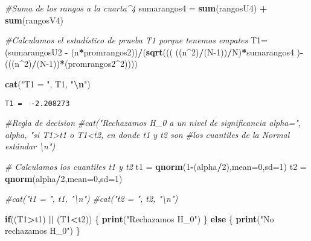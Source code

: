 \documentclass[
  a4paper,
  oneside,
  openany]{book}
\newenvironment{Shaded}{\begin{snugshade}}{\end{snugshade}}
\newcommand{\AttributeTok}[1]{\textcolor[rgb]{0.13,0.29,0.53}{#1}}
\newcommand{\CommentTok}[1]{\textcolor[rgb]{0.56,0.35,0.01}{\textit{#1}}}
\newcommand{\ControlFlowTok}[1]{\textcolor[rgb]{0.13,0.29,0.53}{\textbf{#1}}}
\newcommand{\DecValTok}[1]{\textcolor[rgb]{0.00,0.00,0.81}{#1}}
\newcommand{\FunctionTok}[1]{\textcolor[rgb]{0.13,0.29,0.53}{\textbf{#1}}}
\newcommand{\NormalTok}[1]{#1}
\newcommand{\OtherTok}[1]{\textcolor[rgb]{0.56,0.35,0.01}{#1}}
\newcommand{\SpecialCharTok}[1]{\textcolor[rgb]{0.81,0.36,0.00}{\textbf{#1}}}
\newcommand{\StringTok}[1]{\textcolor[rgb]{0.31,0.60,0.02}{#1}}
\begin{document}
\begin{Shaded}
\begin{Highlighting}[]
\CommentTok{\#Suma de los rangos a la cuarta\^{}4}
\NormalTok{sumarangos4 }\OtherTok{=} \FunctionTok{sum}\NormalTok{(rangosU4) }\SpecialCharTok{+} \FunctionTok{sum}\NormalTok{(rangosV4)}

\CommentTok{\#Calculamos el estadístico de prueba T1 porque tenemos empates}
\NormalTok{T1}\OtherTok{=}\NormalTok{(sumarangosU2 }\SpecialCharTok{{-}}\NormalTok{ (n}\SpecialCharTok{*}\NormalTok{promrangos2))}\SpecialCharTok{/}\NormalTok{(}\FunctionTok{sqrt}\NormalTok{(((      ((n}\SpecialCharTok{\^{}}\DecValTok{2}\NormalTok{)}\SpecialCharTok{/}\NormalTok{(N}\DecValTok{{-}1}\NormalTok{))}\SpecialCharTok{/}\NormalTok{N)}\SpecialCharTok{*}\NormalTok{sumarangos4 )}\SpecialCharTok{{-}}\NormalTok{(((n}\SpecialCharTok{\^{}}\DecValTok{2}\NormalTok{)}\SpecialCharTok{/}\NormalTok{(N}\DecValTok{{-}1}\NormalTok{))}\SpecialCharTok{*}\NormalTok{(promrangos2}\SpecialCharTok{\^{}}\DecValTok{2}\NormalTok{))))}

\FunctionTok{cat}\NormalTok{(}\StringTok{"T1 = "}\NormalTok{, T1, }\StringTok{"}\SpecialCharTok{\textbackslash{}n}\StringTok{"}\NormalTok{)}
\end{Highlighting}
\end{Shaded}

\begin{verbatim}
T1 =  -2.208273 
\end{verbatim}

\begin{Shaded}
\begin{Highlighting}[]
\CommentTok{\#Regla de decision}
\CommentTok{\#cat("Rechazamos H\_0 a un nivel de significancia alpha=", alpha, "si T1\textgreater{}t1 o T1\textless{}t2, en donde t1 y t2 son \#los cuantiles de la Normal estándar \textbackslash{}n")}

\CommentTok{\# Calculamos los cuantiles t1 y t2 }
\NormalTok{t1 }\OtherTok{=} \FunctionTok{qnorm}\NormalTok{(}\DecValTok{1}\SpecialCharTok{{-}}\NormalTok{(alpha}\SpecialCharTok{/}\DecValTok{2}\NormalTok{),}\AttributeTok{mean=}\DecValTok{0}\NormalTok{,}\AttributeTok{sd=}\DecValTok{1}\NormalTok{)}
\NormalTok{t2 }\OtherTok{=} \FunctionTok{qnorm}\NormalTok{(alpha}\SpecialCharTok{/}\DecValTok{2}\NormalTok{,}\AttributeTok{mean=}\DecValTok{0}\NormalTok{,}\AttributeTok{sd=}\DecValTok{1}\NormalTok{)}

\CommentTok{\#cat("t1 = ", t1, "\textbackslash{}n")}
\CommentTok{\#cat("t2 = ", t2, "\textbackslash{}n")}

\ControlFlowTok{if}\NormalTok{((T1}\SpecialCharTok{\textgreater{}}\NormalTok{t1) }\SpecialCharTok{||}\NormalTok{ (T1}\SpecialCharTok{\textless{}}\NormalTok{t2)) \{}
  \FunctionTok{print}\NormalTok{(}\StringTok{"Rechazamos H\_0"}\NormalTok{)}
\NormalTok{\} }\ControlFlowTok{else}\NormalTok{ \{}
  \FunctionTok{print}\NormalTok{(}\StringTok{"No rechazamos H\_0"}\NormalTok{)}
\NormalTok{\}}
\end{Highlighting}
\end{Shaded}
\end{document}
